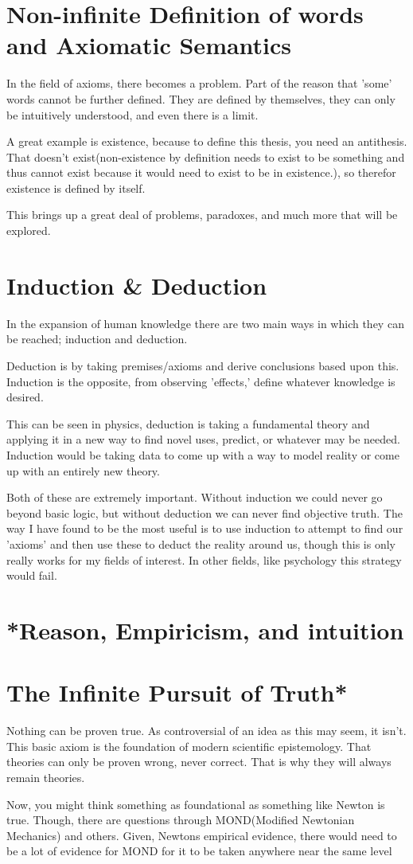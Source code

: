\section{Non-infinite Definition of words and Axiomatic Semantics}
\par In the field of axioms, there becomes a problem. Part of the reason that 'some' words cannot be further defined. They are defined by themselves, they can only be intuitively understood, and even there is a limit.
\par A great example is existence, because to define this thesis, you need an antithesis. That doesn't exist(non-existence by definition needs to exist to be something and thus cannot exist because it would need to exist to be in existence.), so therefor existence is defined by itself.
\par This brings up a great deal of problems, paradoxes, and much more that will be explored.
\section{Induction \& Deduction}
\par In the expansion of human knowledge there are two main ways in which they can be reached; induction and deduction. 
\par Deduction is by taking premises/axioms and derive conclusions based upon this. Induction is the opposite, from observing 'effects,' define whatever knowledge is desired. 
\par This can be seen in physics, deduction is taking a fundamental theory and applying it in a new way to find novel uses, predict, or whatever may be needed. Induction would be taking data to come up with a way to model reality or come up with an entirely new theory. 
\par Both of these are extremely important. Without induction we could never go beyond basic logic, but without deduction we can never find objective truth. The way I have found to be the most useful is to use induction to attempt to find our 'axioms' and then use these to deduct the reality around us, though this is only really works for my fields of interest. In other fields, like psychology this strategy would fail.
\section{*Reason, Empiricism, and intuition}
\section{The Infinite Pursuit of Truth*}
\par Nothing can be proven true. As controversial of an idea as this may seem, it isn't. This basic axiom is the foundation of modern scientific epistemology. That theories can only be proven wrong, never correct. That is why they will always remain theories.
\par Now, you might think something as foundational as something like Newton is true. Though, there are questions through MOND(Modified Newtonian Mechanics) and others. Given, Newtons empirical evidence, there would need to be a lot of evidence for MOND for it to be taken anywhere near the same level 
